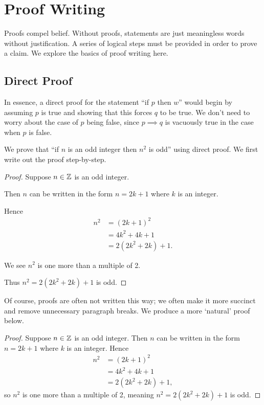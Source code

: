 \chapter{Proof Writing}
Proofs compel belief. Without proofs, statements are just meaningless words without justification. A series of logical steps must be provided in order to prove a claim. We explore the basics of proof writing here.

\section{Direct Proof}
In essence, a direct proof for the statement ``if $p$ then $w$'' would begin by assuming $p$ is true and showing that this forces $q$ to be true. We don't need to worry about the case of $p$ being false, since $p \implies q$ is vacuously true in the case when $p$ is false.
\begin{example}
    We prove that ``if $n$ is an odd integer then $n^2$ is odd'' using direct proof. We first write out the proof step-by-step.
    \begin{proof}
        Suppose $n\in\mathbb{Z}$ is an odd integer.

        Then $n$ can be written in the form $n = 2k + 1$ where $k$ is an integer.

        Hence
        \begin{align*}
            n^2 &= (2k+1)^2\\
            &= 4k^2 + 4k + 1\\
            &= 2(2k^2 + 2k) + 1.
        \end{align*}

        We see $n^2$ is one more than a multiple of 2.

        Thus $n^2 = 2(2k^2 + 2k) + 1$ is odd.
    \end{proof}

    Of course, proofs are often not written this way; we often make it more succinct and remove unnecessary paragraph breaks. We produce a more `natural' proof below.
    \begin{proof}
        Suppose $n\in\mathbb{Z}$ is an odd integer. Then $n$ can be written in the form $n = 2k + 1$ where $k$ is an integer. Hence
        \begin{align*}
            n^2 &= (2k+1)^2\\
            &= 4k^2 + 4k + 1\\
            &= 2(2k^2 + 2k) + 1,
        \end{align*}
        so $n^2$ is one more than a multiple of 2, meaning $n^2 = 2(2k^2 + 2k) + 1$ is odd.
    \end{proof}
\end{example}
